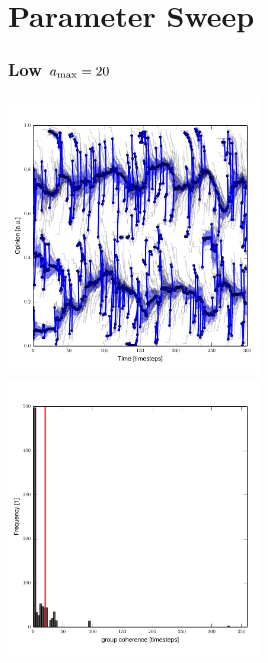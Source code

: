 \documentclass[10pt]{beamer}
\begin{document}
\section{Parameter Sweep}
\begin{frame}\frametitle{Low $a_{\rm max}=20$}
    \begin{center}
        \includegraphics[width=0.5\textwidth]{fig/evol_20.pdf}
        \includegraphics[width=0.5\textwidth]{fig/var_20.pdf}
    \end{center}


\end{frame}
\end{document}

